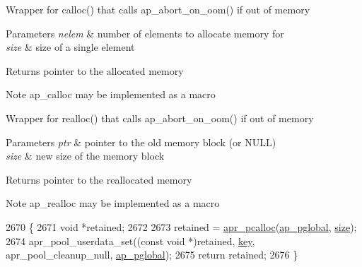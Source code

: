 Wrapper for calloc() that calls ap\+\_\+abort\+\_\+on\+\_\+oom() if out of memory 
\begin{DoxyParams}{Parameters}
{\em nelem} & number of elements to allocate memory for \\
\hline
{\em size} & size of a single element \\
\hline
\end{DoxyParams}
\begin{DoxyReturn}{Returns}
pointer to the allocated memory 
\end{DoxyReturn}
\begin{DoxyNote}{Note}
ap\+\_\+calloc may be implemented as a macro
\end{DoxyNote}
Wrapper for realloc() that calls ap\+\_\+abort\+\_\+on\+\_\+oom() if out of memory 
\begin{DoxyParams}{Parameters}
{\em ptr} & pointer to the old memory block (or N\+U\+LL) \\
\hline
{\em size} & new size of the memory block \\
\hline
\end{DoxyParams}
\begin{DoxyReturn}{Returns}
pointer to the reallocated memory 
\end{DoxyReturn}
\begin{DoxyNote}{Note}
ap\+\_\+realloc may be implemented as a macro 
\end{DoxyNote}

\begin{DoxyCode}
2670 \{
2671     \textcolor{keywordtype}{void} *retained;
2672 
2673     retained = \hyperlink{group__apr__pools_gad214fc0160de3c22b6435e29ea20fce8}{apr\_pcalloc}(\hyperlink{group__APACHE__CORE__MAIN_gae8d16ca8eacac353b47d8d908c630d94}{ap\_pglobal}, \hyperlink{group__APACHE__CORE__CONFIG_ga2bd3edb50f631a96f1b729fde236ff43}{size});
2674     apr\_pool\_userdata\_set((\textcolor{keyword}{const} \textcolor{keywordtype}{void} *)retained, \hyperlink{group__MOD__CACHE_ga11d8023381192746eb96be162398fe1c}{key}, apr\_pool\_cleanup\_null, 
      \hyperlink{group__APACHE__CORE__MAIN_gae8d16ca8eacac353b47d8d908c630d94}{ap\_pglobal});
2675     \textcolor{keywordflow}{return} retained;
2676 \}
\end{DoxyCode}
